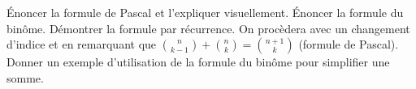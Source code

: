 %
%
	\begin{tasks}
		\task Énoncer la formule de Pascal et l'expliquer visuellement.
		\task Énoncer la formule du binôme.
		\task Démontrer la formule par récurrence. On procèdera avec un changement d'indice et en remarquant que $\binom{n}{k-1} + \binom{n}{k}= \binom{n+1}{k}$ (formule de Pascal).
		\task Donner un exemple d'utilisation de la formule du binôme pour simplifier une somme.
	\end{tasks}
